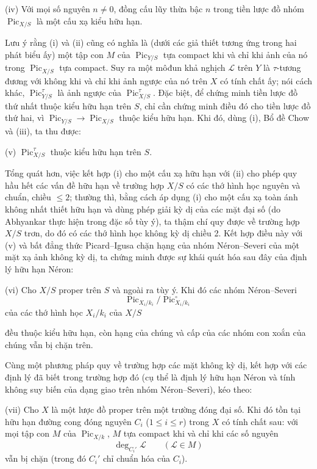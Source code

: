 \noindent(iv) Với mọi số nguyên $n\neq0$, đồng cấu lũy thừa bậc $n$ trong
tiền lược đồ nhóm $\operatorname{Pic}_{X/S}$ là một cấu xạ kiểu hữu hạn.

Lưu ý rằng (i) và (ii) cũng có nghĩa là (dưới các giả thiết tương ứng trong
hai phát biểu ấy) một tập con $M$ của $\operatorname{Pic}_{Y/S}$ tựa compact
khi và chỉ khi ảnh của nó trong $\operatorname{Pic}_{X/S}$ tựa compact. Suy
ra một môđun khả nghịch $\mathcal L$ trên $Y$ là $\tau$-tương đương với không
khi và chỉ khi ảnh ngược của nó trên $X$ có tính chất ấy; nói cách khác,
$\operatorname{Pic}_{Y/S}^\tau$ là ảnh ngược của
$\operatorname{Pic}_{X/S}^\tau$. Đặc biệt, để chứng minh tiền lược đồ thứ
nhất thuộc kiểu hữu hạn trên $S$, chỉ cần chứng minh điều đó cho tiền lược đồ
thứ hai, vì $\operatorname{Pic}_{Y/S}\longrightarrow
\operatorname{Pic}_{X/S}$ thuộc kiểu hữu hạn. Khi đó, dùng (i), Bổ đề Chow và
(iii), ta thu được:

\medskip
\noindent(v) $\operatorname{Pic}_{X/S}^\tau$ thuộc kiểu hữu hạn trên $S$.

Tổng quát hơn, việc kết hợp (i) cho một cấu xạ hữu hạn với (ii) cho phép quy
hầu hết các vấn đề hữu hạn về trường hợp $X/S$ có các thớ hình học nguyên và
chuẩn, chiều $\leq2$; thường thì, bằng cách áp dụng (i) cho một cấu xạ toàn
ánh không nhất thiết hữu hạn và dùng phép giải kỳ dị của các mặt đại số (do
Abhyankar thực hiện trong đặc số tùy ý), ta thậm chí quy được về trường hợp
$X/S$ trơn, do đó có các thớ hình học không kỳ dị chiều 2. Kết hợp điều này
với (v) và bất đẳng thức Picard--Igusa chặn hạng của nhóm Néron--Severi của
một mặt xạ ảnh không kỳ dị, ta chứng minh được sự khái quát hóa sau đây của
định lý hữu hạn Néron:

\medskip
\noindent(vi) Cho $X/S$ proper trên $S$ và ngoài ra tùy ý. Khi đó các nhóm
Néron--Severi
\[
\operatorname{Pic}_{X_i/k_i}/\operatorname{Pic}_{X_i/k_i}^\circ
\]
của các thớ hình học $X_i/k_i$ của $X/S$

đều thuộc kiểu hữu hạn, còn hạng của chúng và cấp của các nhóm con xoắn của
chúng vẫn bị chặn trên.

Cùng một phương pháp quy về trường hợp các mặt không kỳ dị, kết hợp với các
định lý đã biết trong trường hợp đó (cụ thể là định lý hữu hạn Néron và tính
không suy biến của dạng giao trên nhóm Néron--Severi), kéo theo:

\medskip
\noindent(vii) Cho $X$ là một lược đồ proper trên một trường đóng đại số. Khi
đó tồn tại hữu hạn đường cong đóng nguyên $C_i$ ($1\leq i\leq r$) trong $X$
có tính chất sau: với mọi tập con $M$ của $\operatorname{Pic}_{X/k}$, $M$ tựa
compact khi và chỉ khi các số nguyên
\[
\deg_{C_i'}\mathcal L\qquad(\mathcal L\in M)
\]
vẫn bị chặn (trong đó $C_i'$ chỉ chuẩn hóa của $C_i$).

